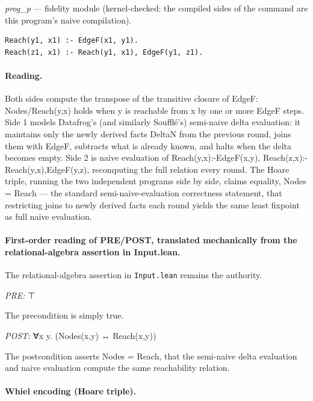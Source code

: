 \documentclass[10pt]{article}
\begin{document}
{\raggedright\textit{prog\_p} --- fidelity module (kernel-checked: the compiled sides of the command are this program's naive compilation).\par}

\begin{Verbatim}[fontsize=\scriptsize,breaklines=true,breakanywhere=true,frame=single,framesep=1.5mm]
Reach(y1, x1) :- EdgeF(x1, y1).
Reach(z1, x1) :- Reach(y1, x1), EdgeF(y1, z1).
\end{Verbatim}

\paragraph{Reading.} Both sides compute the transpose of the transitive closure of EdgeF: Nodes/Reach(y,x) holds when y is reachable from x by one or more EdgeF steps. Side 1 models Datafrog's (and similarly Soufflé's) semi-naive delta evaluation: it maintains only the newly derived facts DeltaN from the previous round, joins them with EdgeF, subtracts what is already known, and halts when the delta becomes empty. Side 2 is naive evaluation of Reach(y,x):-EdgeF(x,y), Reach(z,x):-Reach(y,x),EdgeF(y,z), recomputing the full relation every round. The Hoare triple, running the two independent programs side by side, claims equality, Nodes = Reach --- the standard semi-naive-evaluation correctness statement, that restricting joins to newly derived facts each round yields the same least fixpoint as full naive evaluation.

\paragraph{First-order reading of PRE/POST, translated mechanically from the relational-algebra assertion in Input.lean.} The relational-algebra assertion in \texttt{Input.lean} remains the authority.

\textit{PRE:} ⊤\par The precondition is simply true.

\textit{POST:} ∀x y. (Nodes(x,y) ↔ Reach(x,y))\par The postcondition asserts Nodes = Reach, that the semi-naive delta evaluation and naive evaluation compute the same reachability relation.

\paragraph{Whiel encoding (Hoare triple).}
\end{document}
